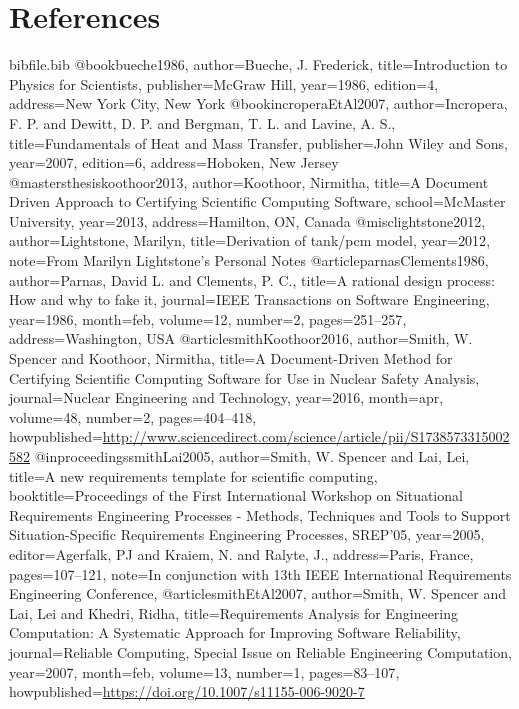 \documentclass[12pt]{article}
\begin{document}
\section{References}
\label{Sec:References}
\begin{filecontents*}{bibfile.bib}
@book{bueche1986,
author={Bueche, J. Frederick},
title={Introduction to Physics for Scientists},
publisher={McGraw Hill},
year={1986},
edition={4},
address={New York City, New York}}
@book{incroperaEtAl2007,
author={Incropera, F. P. and Dewitt, D. P. and Bergman, T. L. and Lavine, A. S.},
title={Fundamentals of Heat and Mass Transfer},
publisher={John Wiley and Sons},
year={2007},
edition={6},
address={Hoboken, New Jersey}}
@mastersthesis{koothoor2013,
author={Koothoor, Nirmitha},
title={A Document Driven Approach to Certifying Scientific Computing Software},
school={McMaster University},
year={2013},
address={Hamilton, ON, Canada}}
@misc{lightstone2012,
author={Lightstone, Marilyn},
title={Derivation of tank/pcm model},
year={2012},
note={From Marilyn Lightstone's Personal Notes}}
@article{parnasClements1986,
author={Parnas, David L. and Clements, P. C.},
title={A rational design process: How and why to fake it},
journal={IEEE Transactions on Software Engineering},
year={1986},
month=feb,
volume={12},
number={2},
pages={251--257},
address={Washington, USA}}
@article{smithKoothoor2016,
author={Smith, W. Spencer and Koothoor, Nirmitha},
title={A Document-Driven Method for Certifying Scientific Computing Software for Use in Nuclear Safety Analysis},
journal={Nuclear Engineering and Technology},
year={2016},
month=apr,
volume={48},
number={2},
pages={404--418},
howpublished={\url{http://www.sciencedirect.com/science/article/pii/S1738573315002582}}}
@inproceedings{smithLai2005,
author={Smith, W. Spencer and Lai, Lei},
title={A new requirements template for scientific computing},
booktitle={Proceedings of the First International Workshop on Situational Requirements Engineering Processes - Methods, Techniques and Tools to Support Situation-Specific Requirements Engineering Processes, SREP'05},
year={2005},
editor={Agerfalk, PJ and Kraiem, N. and Ralyte, J.},
address={Paris, France},
pages={107--121},
note={In conjunction with 13th IEEE International Requirements Engineering Conference,}}
@article{smithEtAl2007,
author={Smith, W. Spencer and Lai, Lei and Khedri, Ridha},
title={Requirements Analysis for Engineering Computation: A Systematic Approach for Improving Software Reliability},
journal={Reliable Computing, Special Issue on Reliable Engineering Computation},
year={2007},
month=feb,
volume={13},
number={1},
pages={83--107},
howpublished={\url{https://doi.org/10.1007/s11155-006-9020-7}}}
\end{filecontents*}
\nocite{*}
\printbibliography[heading=none]
\end{document}
